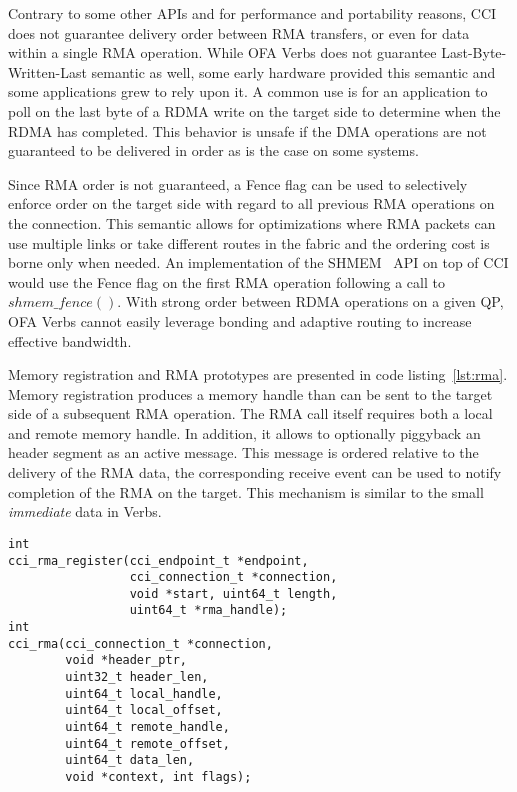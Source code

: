 Contrary to some other APIs  and for performance and portability reasons, CCI does not guarantee delivery order between RMA transfers, or even for data within a single RMA operation. While OFA Verbs does not guarantee Last-Byte-Written-Last semantic as well, some early hardware provided this semantic and some applications grew to rely upon it. A common use is for an application to poll on the last byte of a RDMA write on the target side to determine when the RDMA has completed. This behavior is unsafe if the DMA operations are not guaranteed to be delivered in order as is the case on some systems.

Since RMA order is not guaranteed, a Fence flag can be used to selectively 
enforce order on the target side with regard to all previous RMA operations 
on the connection. This semantic allows for optimizations where RMA packets 
can use multiple links or take different routes in the fabric and the ordering 
cost is borne only when needed. An implementation of the SHMEM~\cite{openshmem} API on top of CCI would use the Fence flag on the first RMA operation following a call to $shmem\_fence()$. With strong order between RDMA operations on a given QP, OFA Verbs cannot easily leverage bonding and adaptive routing to increase effective bandwidth.

Memory registration and RMA prototypes are presented in code listing~\ref{lst:rma}. Memory registration produces a memory handle than can be sent to the target side of a subsequent RMA operation. The RMA call itself requires both a local and remote memory handle. In addition, it allows to optionally piggyback an header segment as an active message. This message is ordered relative to the delivery of the RMA data, the corresponding receive event can be used to notify completion of the RMA on the target. This mechanism is similar to the small \emph{immediate} data in Verbs.

\lstset{language=C, frame=single, basicstyle=\ttfamily\small}
\begin{lstlisting}[label=lst:rma, caption=CCI RMA prototypes]
int 
cci_rma_register(cci_endpoint_t *endpoint,
                 cci_connection_t *connection,
                 void *start, uint64_t length,
                 uint64_t *rma_handle);
int 
cci_rma(cci_connection_t *connection, 
        void *header_ptr, 
        uint32_t header_len, 
        uint64_t local_handle, 
        uint64_t local_offset, 
        uint64_t remote_handle, 
        uint64_t remote_offset,
        uint64_t data_len, 
        void *context, int flags);
\end{lstlisting}


